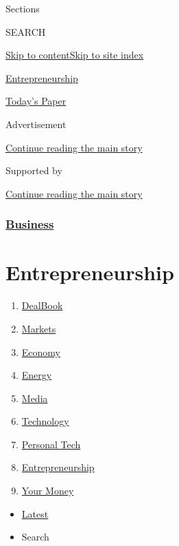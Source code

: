 Sections

SEARCH

\protect\hyperlink{site-content}{Skip to
content}\protect\hyperlink{site-index}{Skip to site index}

\href{https://www.nytimes.com/pages/business/smallbusiness/index.html}{Entrepreneurship}

\href{https://myaccount.nytimes.com/auth/login?response_type=cookie\&client_id=vi}{}

\href{https://www.nytimes.com/section/todayspaper}{Today's Paper}

Advertisement

\protect\hyperlink{after-top}{Continue reading the main story}

Supported by

\protect\hyperlink{after-sponsor}{Continue reading the main story}

\hypertarget{business}{%
\subsubsection{\texorpdfstring{\href{/section/business}{Business}}{Business}}\label{business}}

\hypertarget{entrepreneurship}{%
\section{Entrepreneurship}\label{entrepreneurship}}

\begin{enumerate}
\def\labelenumi{\arabic{enumi}.}
\tightlist
\item
  \href{/pages/business/dealbook/index.html}{DealBook}
\item
  \href{https://markets.on.nytimes.com}{Markets}
\item
  \href{/section/business/economy}{Economy}
\item
  \href{/section/business/energy-environment}{Energy}
\item
  \href{/section/business/media}{Media}
\item
  \href{/section/technology}{Technology}
\item
  \href{/section/technology/personaltech}{Personal Tech}
\item
  \href{/section/business/smallbusiness}{Entrepreneurship}
\item
  \href{/section/your-money}{Your Money}
\end{enumerate}

\begin{itemize}
\tightlist
\item
  \protect\hyperlink{stream-panel}{Latest}
\item
  Search
\end{itemize}

